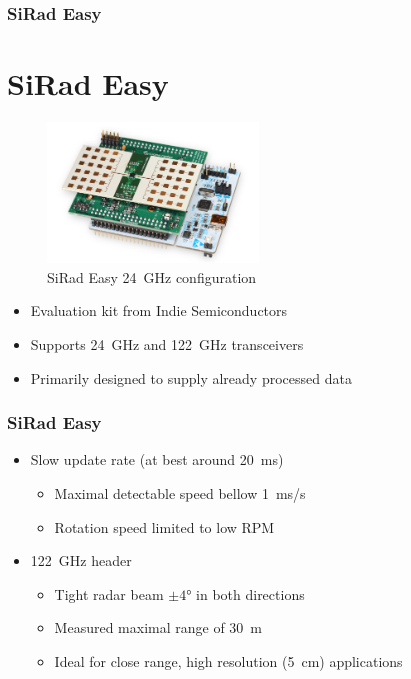 \documentclass[aspectratio=43]{beamer}
\begin{document}
\begin{frame}[fragile]
  \frametitle{SiRad Easy}
  \section{SiRad Easy}

  \begin{figure}[h!]
    \centering
    \includegraphics[width=0.5\textwidth]{../img/sirad.png}

    \caption{SiRad Easy  24~GHz configuration }
    \label{fig:sirad}
  \end{figure}

  \begin{itemize}
    \item Evaluation kit from Indie Semiconductors
    \item Supports 24~GHz and 122~GHz transceivers
    \item Primarily designed to supply already processed data
  \end{itemize}
\end{frame}

\begin{frame}[fragile]
  \frametitle{SiRad Easy}

  \begin{itemize}
    \item Slow update rate (at best around 20~ms)
      \begin{itemize}
        \item Maximal detectable speed bellow 1~ms/s
				\item Rotation speed limited to low RPM
      \end{itemize}
    \item 122~GHz header
      \begin{itemize}
        \item Tight radar beam $\pm 4$° in both directions
        \item Measured maximal range of 30~m
				\item Ideal for close range, high resolution (5~cm) applications
      \end{itemize}
  \end{itemize}
\end{frame}
\end{document}
